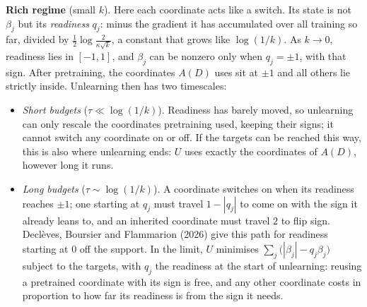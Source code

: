 \documentclass[10pt]{article}
\begin{document}
\textbf{Rich regime} (small $k$). Here each coordinate acts like a switch. Its state is not $\beta_j$ but its \emph{readiness} $q_j$: minus the gradient it has accumulated over all training so far, divided by $\frac12\log\frac{2}{\kappa\sqrt k}$, a constant that grows like $\log(1/k)$. As $k\to0$, readiness lies in $[-1,1]$, and $\beta_j$ can be nonzero only when $q_j=\pm1$, with that sign. After pretraining, the coordinates $A(D)$ uses sit at $\pm1$ and all others lie strictly inside. Unlearning then has two timescales:
\begin{itemize}\itemsep1pt
\item \emph{Short budgets} ($\tau\ll\log(1/k)$). Readiness has barely moved, so unlearning can only rescale the coordinates pretraining used, keeping their signs; it cannot switch any coordinate on or off. If the targets can be reached this way, this is also where unlearning ends: $U$ uses exactly the coordinates of $A(D)$, however long it runs.
\item \emph{Long budgets} ($\tau\sim\log(1/k)$). A coordinate switches on when its readiness reaches $\pm1$; one starting at $q_j$ must travel $1-|q_j|$ to come on with the sign it already leans to, and an inherited coordinate must travel $2$ to flip sign. Declèves, Boursier and Flammarion (2026) give this path for readiness starting at $0$ off the support. In the limit, $U$ minimises $\sum_j\big(|\beta_j|-q_j\beta_j\big)$ subject to the targets, with $q_j$ the readiness at the start of unlearning: reusing a pretrained coordinate with its sign is free, and any other coordinate costs in proportion to how far its readiness is from the sign it needs.
\end{itemize}
\end{document}
